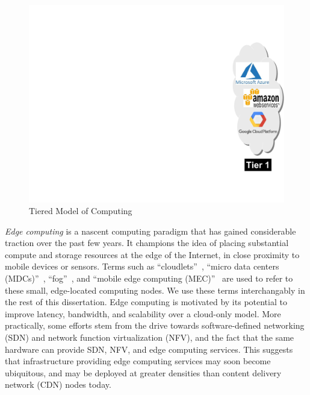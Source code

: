 \begin{figure}[t]
\begin{minipage}[c]{2.7in}
\end{minipage}
\begin{minipage}[c]{1in}
\includegraphics[scale=0.45]{FIGS/fig-3tier-C.pdf}
\end{minipage}
\centering
{}
\caption{Tiered Model of Computing}
\label{fig:3tier}
\end{figure}

{\em Edge computing} is a nascent computing paradigm that has gained
considerable traction over the past few years. It champions the idea of placing
substantial compute and storage resources at the edge of the Internet, in close
proximity to mobile devices or sensors.  Terms such as
``cloudlets''~\cite{Satya2009}, ``micro data centers (MDCs)''~\cite{Greene2012},
``fog''~\cite{Bonomi2012}, and ``mobile edge computing (MEC)''~\cite{Brown2013}
are used to refer to these small, edge-located computing nodes.  We use these
terms interchangably in the rest of this dissertation. Edge computing is motivated by
its potential to improve latency, bandwidth, and scalability over a cloud-only
model.  More practically, some efforts stem from the drive towards
software-defined networking (SDN) and network function virtualization (NFV), and
the fact that the same hardware can provide SDN, NFV, and edge computing
services. This suggests that infrastructure providing edge computing services
may soon become ubiquitous, and may be deployed at greater densities than
content delivery network (CDN) nodes today. 

